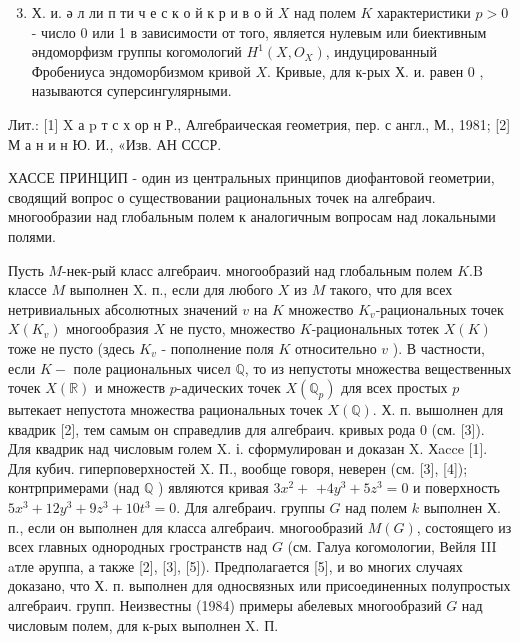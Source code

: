 \documentclass[10pt]{article}
\begin{document}
\begin{enumerate}

  \setcounter{enumi}{2}

  \item Х. и. ә л ли п ти ч е с к о й к р и в о й $X$ над полем $K$ характеристики $p>0$ - число 0 или 1 в зависимости от того, является нулевым или биективным әндоморфизм группы когомологий $H^{1}\left(X, O_{X}\right)$, индуцированный Фробениуса эндоморбизмом кривой $X$. Кривые, для к-рых Х. и. равен 0 , называются суперсингулярными.

\end{enumerate}



Лит.: [1] X а p т с х ор н Р., Алгебраическая геометрия, пер. с англ., М., 1981; [2] М а н и н Ю. И., «Изв. АН СССР.



ХАССЕ ПРИНЦИП - один из центральных принципов диофантовой геометрии, сводящий вопрос о существовании рациональных точек на алгебраич. многообразии над глобальным полем к аналогичным вопросам над локальными полями.



Пусть $M$-нек-рый класс алгебраич. многообразий над глобальным полем $K . \mathrm{B}$ классе $M$ выполнен $\mathrm{X}$. п., если для любого $X$ из $M$ такого, что для всех нетривиальных абсолютных значений $v$ на $K$ множество $K_{v}$-рациональных точек $X\left(K_{v}\right)$ многообразия $X$ не пусто, множество $K$-рациональных тотек $X(K)$ тоже не пусто (здесь $K_{v}$ - пополнение поля $K$ относительно $v$ ). В частности, если $K-$ поле рациональных чисел $\mathbb{Q}$, то из непустоты множества вещественных точек $X(\mathbb{R})$ и множеств $p$-адических точек $X\left(\mathbb{Q}_{p}\right)$ для всех простых $p$ вытекает непустота множества рациональных точек $X(\mathbb{Q})$. Х. п. вышолнен для квадрик [2], тем самым он справедлив для алгебраич. кривых рода 0 (см. [3]). Для квадрик над числовым голем X. і. сформулирован и доказан X. Хacce [1]. Для кубич. гиперповерхностей X. П., вообще говоря, неверен (см. [3], [4]); контрпримерами (над $\mathbb{Q}$ ) являются кривая $3 x^{2}+$ $+4 y^{3}+5 z^{3}=0$ и поверхность $5 x^{3}+12 y^{3}+9 z^{3}+10 t^{3}=0$. Для алгебраич. группы $G$ над полем $k$ выполнен Х. п., если он выполнен для класса алгебраич. многообразий $M(G)$, состоящего из всех главных однородных гространств над $G$ (см. Галуа когомологии, Вейля III aтле әруппа, а также [2], [3], [5]). Предполагается [5], и во многих случаях доказано, что Х. п. выполнен для односвязных или присоединенных полупростых алгебраич. групп. Неизвестны (1984) примеры абелевых многообразий $G$ над числовым полем, для к-рых выполнен $\mathrm{X}$. П.
\end{document}
